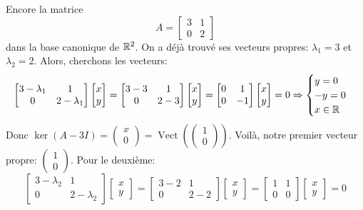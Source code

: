 \begin{eg}
   Encore la matrice  
   \[
       A = \begin{bmatrix} 3 & 1\\ 0 & 2 \end{bmatrix} 
   \] 
   dans la base canonique de $\mathbb{R}^2$. On a déjà trouvé ses vecteurs propres: $\lambda_1 = 3$ et $\lambda_2 = 2$. Alors, cherchons les vecteurs:
   \[
       \begin{bmatrix} 3 - \lambda_1 & 1 \\ 0 & 2 - \lambda_1 \end{bmatrix}\begin{bmatrix} x \\ y \end{bmatrix} = \begin{bmatrix} 3 - 3 & 1 \\ 0 & 2 - 3 \end{bmatrix}\begin{bmatrix} x \\ y \end{bmatrix} = \begin{bmatrix} 0 & 1 \\ 0 & -1 \end{bmatrix}\begin{bmatrix} x \\ y \end{bmatrix} = 0 
       \Rightarrow \begin{cases}
           y = 0\\
           -y = 0\\
           x \in \mathbb{R}
       \end{cases}
   \] 
   Donc $\ker(A - 3I) = \begin{pmatrix} x \\ 0 \end{pmatrix} =  \operatorname{Vect}(\begin{pmatrix} 1 \\ 0 \end{pmatrix} )$. Voilà, notre premier vecteur propre: $\begin{pmatrix} 1 \\ 0 \end{pmatrix} $. Pour le deuxième:
   \[
       \begin{bmatrix} 3 - \lambda_2 & 1 \\ 0 & 2 - \lambda_2 \end{bmatrix}\begin{bmatrix} x \\ y \end{bmatrix} = \begin{bmatrix} 3 - 2 & 1 \\ 0 & 2 - 2 \end{bmatrix}\begin{bmatrix} x \\ y \end{bmatrix} = \begin{bmatrix} 1 & 1 \\ 0 & 0 \end{bmatrix}\begin{bmatrix} x \\ y \end{bmatrix} = 0 
\]
\end{eg}
